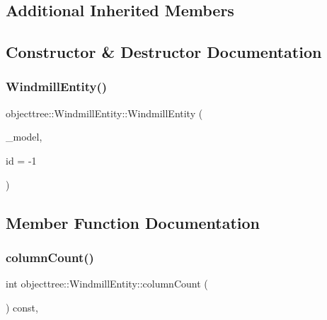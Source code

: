 \subsection*{Additional Inherited Members}


\subsection{Constructor \& Destructor Documentation}
\mbox{\label{classobjecttree_1_1_windmill_entity_a5c3cf3cd54c64356c6ab8ecd4dcaaeea}} 
\subsubsection{\texorpdfstring{WindmillEntity()}{WindmillEntity()}}
{\footnotesize\ttfamily objecttree\+::\+Windmill\+Entity\+::\+Windmill\+Entity (\begin{DoxyParamCaption}\item[{\mbox{\hyperlink{class_object_tree_model}{Object\+Tree\+Model}} $\ast$}]{\+\_\+model,  }\item[{int}]{id = {\ttfamily -\/1} }\end{DoxyParamCaption})}



\subsection{Member Function Documentation}
\mbox{\label{classobjecttree_1_1_windmill_entity_a60196c3cff85af9e62db46dc72e8d0d8}} 
\subsubsection{\texorpdfstring{columnCount()}{columnCount()}}
{\footnotesize\ttfamily int objecttree\+::\+Windmill\+Entity\+::column\+Count (\begin{DoxyParamCaption}{ }\end{DoxyParamCaption}) const\hspace{0.3cm}{\ttfamily [override]}, {\ttfamily [virtual]}}



